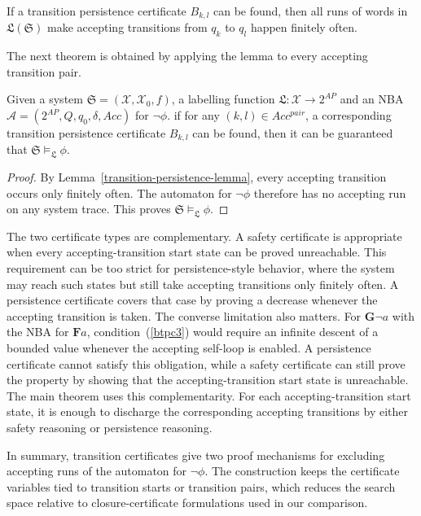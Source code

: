 \begin{lemma}
  \label{transition-persistence-lemma}
  If a transition persistence certificate $B_{k,l}$ can be found, then all runs of words in $\mathfrak{L}(\mathfrak{S})$ make accepting transitions from $q_k$ to $q_l$ happen finitely often.
\end{lemma}

The next theorem is obtained by applying the lemma to every accepting transition pair.

\begin{theorem}
  \label{transition-persistence-LTL}
  Given a system $\mathfrak{S} = (\mathcal{X}, \mathcal{X}_0, f)$, a labelling function $\mathfrak{L}:\mathcal{X} \rightarrow 2^{AP}$ and an NBA $\mathcal{A} = (2^{AP}, Q, q_0, \delta, Acc)$ for $\neg\phi$. if for any $(k, l) \in Acc^{pair}$, a corresponding transition persistence certificate $B_{k,l}$ can be found, then it can be guaranteed that $\mathfrak{S} \models_{\mathfrak{L}} \phi$.
\end{theorem}

\begin{proof}
By Lemma~\ref{transition-persistence-lemma}, every accepting transition occurs only finitely often. The automaton for $\neg\phi$ therefore has no accepting run on any system trace. This proves $\mathfrak{S} \models_{\mathfrak{L}} \phi$.
\end{proof}

The two certificate types are complementary. A safety certificate is appropriate when every accepting-transition start state can be proved unreachable. This requirement can be too strict for persistence-style behavior, where the system may reach such states but still take accepting transitions only finitely often. A persistence certificate covers that case by proving a decrease whenever the accepting transition is taken. The converse limitation also matters. For $\mathbf{G}\neg a$ with the NBA for $\mathbf{F}a$, condition~(\ref{btpc3}) would require an infinite descent of a bounded value whenever the accepting self-loop is enabled. A persistence certificate cannot satisfy this obligation, while a safety certificate can still prove the property by showing that the accepting-transition start state is unreachable. The main theorem uses this complementarity. For each accepting-transition start state, it is enough to discharge the corresponding accepting transitions by either safety reasoning or persistence reasoning.


In summary, transition certificates give two proof mechanisms for excluding accepting runs of the automaton for $\neg\phi$. The construction keeps the certificate variables tied to transition starts or transition pairs, which reduces the search space relative to closure-certificate formulations used in our comparison.

